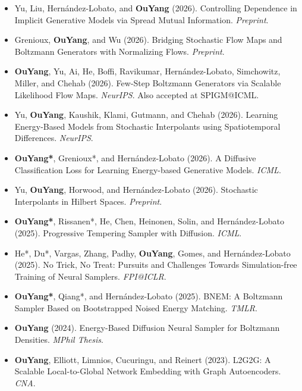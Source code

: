    \begin{itemize}[topsep=0.10 cm, partopsep=0pt, parsep=0pt, itemsep=0.05 cm, before={\relax}]
        \item Yu, Liu, Hernández-Lobato, and \textbf{OuYang} (2026). {\color{teal}Controlling Dependence in Implicit Generative Models via Spread Mutual Information}. \textit{Preprint}.
        \item Grenioux, \textbf{OuYang}, and Wu (2026). {\color{teal}Bridging Stochastic Flow Maps and Boltzmann Generators with Normalizing Flows}. \textit{Preprint}.
        \item \textbf{OuYang}, Yu, Ai, He, Boffi, Ravikumar, Hernández-Lobato, Simchowitz, Miller, and Chehab (2026). {\color{teal}Few-Step Boltzmann Generators via Scalable Likelihood Flow Maps}. \textit{NeurIPS}. Also accepted at SPIGM@ICML.
        \item Yu, \textbf{OuYang}, Kaushik, Klami, Gutmann, and Chehab (2026). {\color{teal}Learning Energy-Based Models from Stochastic Interpolants using Spatiotemporal Differences}. \textit{NeurIPS}.
        \item \textbf{OuYang*}, Grenioux*, and Hernández-Lobato (2026). {\color{teal}A Diffusive Classification Loss for Learning Energy-based Generative Models}. \textit{ICML}.
        \item Yu, \textbf{OuYang}, Horwood, and Hernández-Lobato (2026). {\color{teal}Stochastic Interpolants in Hilbert Spaces}. \textit{Preprint}.
        \item \textbf{OuYang*}, Rissanen*, He, Chen, Heinonen, Solin, and Hernández-Lobato (2025). {\color{teal}Progressive Tempering Sampler with Diffusion}. \textit{ICML}.
        \item He*, Du*, Vargas, Zhang, Padhy, \textbf{OuYang}, Gomes, and Hernández-Lobato (2025). {\color{teal}No Trick, No Treat: Pursuits and Challenges Towards Simulation-free Training of Neural Samplers}. \textit{FPI@ICLR}.
        \item \textbf{OuYang*}, Qiang*, and Hernández-Lobato (2025). {\color{teal}BNEM: A Boltzmann Sampler Based on Bootstrapped Noised Energy Matching}. \textit{TMLR}.
        \item \textbf{OuYang} (2024). {\color{teal}Energy-Based Diffusion Neural Sampler for Boltzmann Densities}. \textit{MPhil Thesis}.
        \item \textbf{OuYang}, Elliott, Limnios, Cucuringu, and Reinert (2023). {\color{teal}L2G2G: A Scalable Local-to-Global Network Embedding with Graph Autoencoders}. \textit{CNA}.
    \end{itemize}
